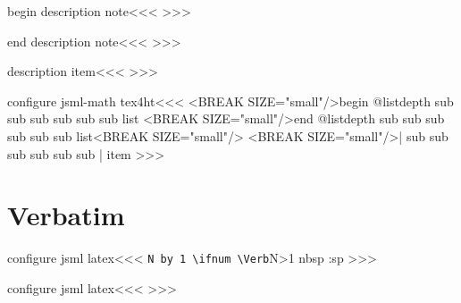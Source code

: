 \<begin description note\><<<
%
>>>


\<end description note\><<<
%
>>>

\<description item\><<<
%
>>>


\<configure jsml-math tex4ht\><<<
   {<BREAK SIZE="small"/>begin \ifcase\csname @listdepth\endcsname
          \or \or sub \or sub sub \or sub sub sub \else\fi
       list}
   {<BREAK SIZE="small"/>end \ifcase\csname @listdepth\endcsname
         \or sub \or sub sub \or sub sub sub \else\fi
       list<BREAK SIZE="small"/>}
   {<BREAK SIZE="small"/>|%
          \or \or sub \or sub sub \or sub sub sub \else\fi|%
       item}
>>>






\section{Verbatim}

\<configure jsml latex\><<<
   {\HAdvance\Verb:N by 1 \ifnum \Verb:N>1 
      \:nbsp \fi}
   {\a:sp}
\def\env:verb#1{\ifinner\else \vfill\break\fi
  \IgnorePar\EndP  \HAssign\Verb:N=0
  \HCode{<PARA><div class="#1"\a:LRdir>%
    \add:description{added-description}{begin verbatim}%
    <PROS \a:verbatim::style >}\EndNoFonts}
\def\endenv:verb{\NoFonts
  \EndP \ht:special{t4ht=</PROS>%
    \add:description{added-description}{end verbatim}%
    </div></PARA>}|<try inline par|>}
>>>


\<configure jsml latex\><<<
   {}
   {}
>>>




% 
% 





